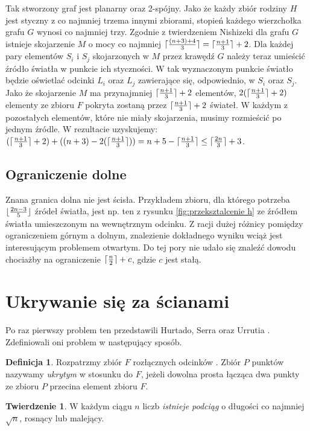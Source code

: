 \documentclass[brudnopis]{xmgr}
\DeclarePairedDelimiter\ceil{\lceil}{\rceil}
\DeclarePairedDelimiter\floor{\lfloor}{\rfloor}
\theoremstyle{definition}
\newtheorem{Twierdzenie}{Twierdzenie}
\newtheorem{Definicja}{Definicja}
\begin{document}
Tak stworzony graf jest planarny oraz 2-spójny. Jako że każdy zbiór rodziny $H$ jest styczny z co najmniej trzema innymi zbiorami, stopień każdego wierzchołka grafu $G$ wynosi co najmniej trzy. Zgodnie z twierdzeniem Nishizeki \cite{nishizeki} dla grafu $G$ istnieje skojarzenie $M$ o mocy co najmniej $\ceil{\frac{(n+3)+4}{3}} = \ceil{\frac{n+1}{3}}  + 2$. Dla każdej pary elementów $S_i$ i $S_j$ skojarzonych w $M$ przez krawędź $G$ należy teraz umieścić źródło światła w punkcie ich styczności. W tak wyznaczonym punkcie światło będzie oświetlać odcinki $L_i$ oraz $L_j$ zawierające się, odpowiednio, w $S_i$ oraz $S_j$. Jako że skojarzenie $M$ ma przynajmniej $\ceil{\frac{n+1}{3}} + 2$ elementów, $2(\ceil{\frac{n+1}{3}} + 2)$ elementy ze zbioru $F$ pokryta zostaną przez $\ceil{\frac{n+1}{3}} + 2$ świateł. W każdym z pozostałych elementów, które nie miały skojarzenia, musimy rozmieścić po jednym źródle. W rezultacie uzyskujemy:
$(\ceil{\frac{n+1}{3}} + 2) + ((n + 3) - 2(\ceil{\frac{n+1}{3}})) = n + 5 - \ceil{\frac{n+1}{3}} \le \ceil{\frac{2n}{3}} + 3$.

\subsection{Ograniczenie dolne}
\indent Znana granica dolna nie jest ścisła. Przykładem zbioru, dla którego potrzeba $\floor{\frac{2n-3}{5}}$ źródeł światła, jest np. ten z rysunku \ref{fig:przeksztalcenie h} ze źródłem światła umieszczonym na wewnętrznym odcinku. Z racji dużej różnicy pomiędzy ograniczeniem górnym a dolnym, znalezienie dokładnego wyniku wciąż jest interesującym problemem otwartym. Do tej pory nie udało się znaleźć dowodu chociażby na ograniczenie $\ceil{\frac{n}{2}} + c$, gdzie $c$ jest stałą.

\section{Ukrywanie się za ścianami}
Po raz pierwszy problem ten przedstawili Hurtado, Serra oraz Urrutia \cite{sciany}. Zdefiniowali oni problem w następujący sposób.

\begin{Definicja}\label{ukrywanie definicja}
 Rozpatrzmy zbiór $F$ rozłącznych odcinków . Zbiór $P$ punktów nazywamy \emph{ukrytym} w stosunku do $F$, jeżeli dowolna prosta łącząca dwa punkty ze zbioru $P$ przecina element zbioru $F$.
\end{Definicja}

\begin{Twierdzenie}\label{podciag rosnacy} \cite{illumination}
  W każdym ciągu $n$ liczb \emph{istnieje podciąg} o długości co najmniej $\sqrt{n}$, rosnący lub malejący.
\end{Twierdzenie}
\end{document}

